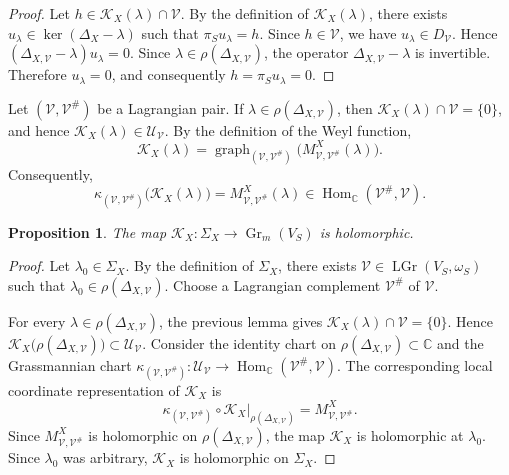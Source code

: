 \documentclass[12pt]{amsart}
\theoremstyle{plain}
\newtheorem{prop}[thm]{Proposition}
\theoremstyle{definition}
\theoremstyle{remark}
\numberwithin{equation}{section} \numberwithin{figure}{section}
\newcommand{\mb}[1]{\mathbb{#1}} %
\newcommand{\mc}[1]{\mathcal{#1}}
\begin{document}
\begin{proof}
Let \(h\in\mc K_X(\lambda)\cap\mc V\). By the definition of
\(\mc K_X(\lambda)\), there exists
\(u_\lambda\in\ker(\Delta_X-\lambda)\) such that
\(\pi_Su_\lambda=h\). Since \(h\in\mc V\), we have
\(u_\lambda\in D_{\mc V}\). Hence
\(
    (\Delta_{X,\mc V}-\lambda)u_\lambda=0.
\)
Since \(\lambda\in\rho(\Delta_{X,\mc V})\),
the operator \(\Delta_{X,\mc V}-\lambda\) is invertible. Therefore
\(u_\lambda=0\), and consequently \(h=\pi_Su_\lambda=0\).
\end{proof}



Let \((\mc V,\mc V^\#)\) be a Lagrangian pair. If
\(\lambda\in\rho(\Delta_{X,\mc V})\), then
\(\mc K_X(\lambda)\cap\mc V=\{0\}\), and hence
\(\mc K_X(\lambda)\in\mc U_{\mc V}\). By the definition of the Weyl
function,
\[
    \mc K_X(\lambda)
    =
    \operatorname{graph}_{(\mc V,\mc V^\#)}
    \bigl(M_{\mc V,\mc V^\#}^X(\lambda)\bigr).
\]
Consequently,
\[
    \kappa_{(\mc V,\mc V^\#)}
    \bigl(\mc K_X(\lambda)\bigr)
    =
    M_{\mc V,\mc V^\#}^X(\lambda)
    \in
    \operatorname{Hom}_{\mb C}(\mc V^\#,\mc V).
\]

\begin{prop}
The map
\(
    \mc K_X:
    \Sigma_X
    \longrightarrow
    \operatorname{Gr}_m(V_S)
\)
is holomorphic.
\end{prop}

\begin{proof}
Let \(\lambda_0\in\Sigma_X\). By the definition of \(\Sigma_X\), there
exists \(\mc V\in\operatorname{LGr}(V_S,\omega_S)\) such that
\(\lambda_0\in\rho(\Delta_{X,\mc V})\). Choose a Lagrangian complement
\(\mc V^\#\) of \(\mc V\).

For every \(\lambda\in\rho(\Delta_{X,\mc V})\), the previous lemma
gives \(\mc K_X(\lambda)\cap\mc V=\{0\}\). Hence
\(
    \mc K_X\bigl(\rho(\Delta_{X,\mc V})\bigr)
    \subset
    \mc U_{\mc V}.
\)
Consider the identity chart on
\(\rho(\Delta_{X,\mc V})\subset\mb C\) and the Grassmannian chart
\(
    \kappa_{(\mc V,\mc V^\#)}:
    \mc U_{\mc V}
    \longrightarrow
    \operatorname{Hom}_{\mb C}(\mc V^\#,\mc V).
\)
The corresponding local coordinate representation of \(\mc K_X\) is
\[
    \kappa_{(\mc V,\mc V^\#)}
    \circ
    \mc K_X\big|_{\rho(\Delta_{X,\mc V})}
    =
    M_{\mc V,\mc V^\#}^X.
\]
Since \(M_{\mc V,\mc V^\#}^X\) is holomorphic on
\(\rho(\Delta_{X,\mc V})\), the map \(\mc K_X\) is holomorphic at
\(\lambda_0\). Since \(\lambda_0\) was arbitrary, \(\mc K_X\) is
holomorphic on \(\Sigma_X\).
\end{proof}
\end{document}
